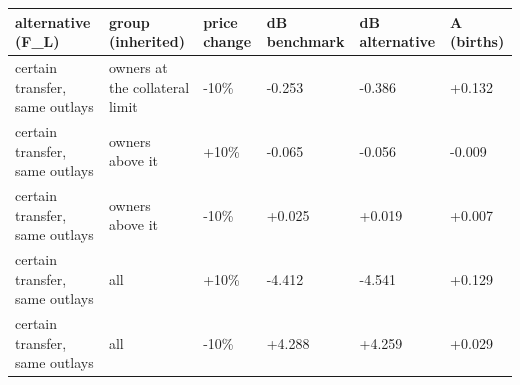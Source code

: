 \begingroup\small
\setlength{\tabcolsep}{3pt}
\renewcommand{\arraystretch}{1.04}
\begin{tabularx}{\linewidth}{XXXXXX}
\toprule
alternative (F\_L) & group (inherited) & price change & dB benchmark & dB alternative & A (births) \\
\midrule
certain transfer, same outlays & owners at the collateral limit & -10\% & -0.253 & -0.386 & +0.132 \\
certain transfer, same outlays & owners above it & +10\% & -0.065 & -0.056 & -0.009 \\
certain transfer, same outlays & owners above it & -10\% & +0.025 & +0.019 & +0.007 \\
certain transfer, same outlays & all & +10\% & -4.412 & -4.541 & +0.129 \\
certain transfer, same outlays & all & -10\% & +4.288 & +4.259 & +0.029 \\
\bottomrule
\end{tabularx}
\endgroup
